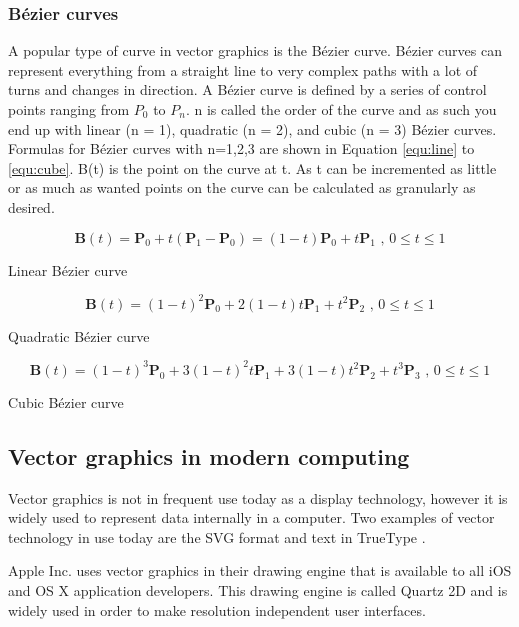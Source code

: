 \subsubsection{Bézier curves}
\label{sec:bezier}
A popular type of curve in vector graphics is the Bézier curve.
Bézier curves can represent everything from a straight line to very complex paths with a lot of turns and changes in direction.
A Bézier curve is defined by a series of control points ranging from \(P_0\) to \(P_n\).
n is called the order of the curve and as such you end up with linear (n = 1), quadratic (n = 2), and cubic (n = 3) Bézier curves.
Formulas for Bézier curves with n=1,2,3 are shown in Equation \ref{equ:line} to \ref{equ:cube}.
B(t) is the point on the curve at t.
As t can be incremented as little or as much as wanted points on the curve can be calculated as granularly as desired.

\begin{cequation}[H]
	\begin{equation}
	    \label{equ:line}
		\mathbf{B}(t)=\mathbf{P}_0 + t(\mathbf{P}_1-\mathbf{P}_0)=(1-t)\mathbf{P}_0 + t\mathbf{P}_1 \mbox{ , } 0 \le t \le 1
	\end{equation}
	\caption{Linear Bézier curve}
\end{cequation}

\begin{cequation}[H]
	\begin{equation}
		\mathbf{B}(t) = (1 - t)^{2}\mathbf{P}_0 + 2(1 - t)t\mathbf{P}_1 + t^{2}\mathbf{P}_2 \mbox{ , } 0 \le t \le 1
	\end{equation}
	\caption{Quadratic Bézier curve}
\end{cequation}

\begin{cequation}[H]
	\begin{equation}
	    \label{equ:cube}
		\mathbf{B}(t)=(1-t)^3\mathbf{P}_0+3(1-t)^2t\mathbf{P}_1+3(1-t)t^2\mathbf{P}_2+t^3\mathbf{P}_3 \mbox{ , } 0 \le t \le 1
	\end{equation}
	\caption{Cubic Bézier curve}
\end{cequation}

\subsection{Vector graphics in modern computing}

Vector graphics is not in frequent use today as a display technology, however it is widely used to represent data internally in a computer.
Two examples of vector technology in use today are the SVG format and text in TrueType \cite{truetype}.

Apple Inc. \cite{apple} uses vector graphics in their drawing engine that is available to all iOS and OS X application developers.
This drawing engine is called Quartz 2D \cite{quartz2d} and is widely used in order to make resolution independent user interfaces.
